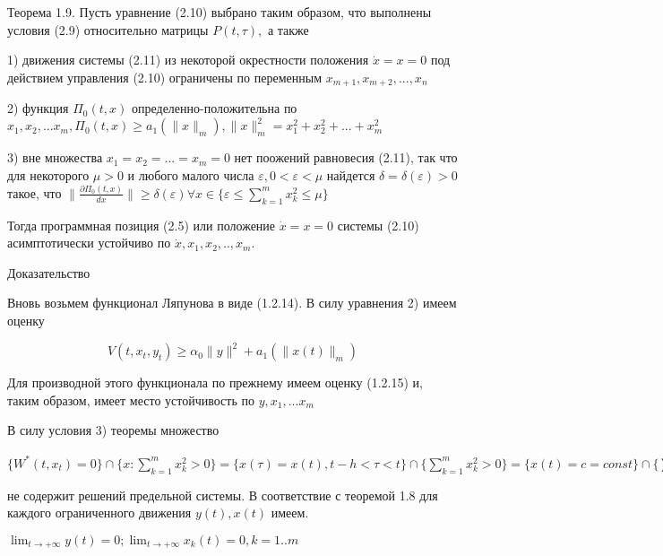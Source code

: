 \begin{theorem}
\begin{theorem}\label{t-1.9}
Теорема 1.9. Пусть уравнение (2.10) выбрано таким образом, что выполнены условия (2.9) относительно матрицы $P(t, \tau),$ а также 

1) движения системы (2.11) из некоторой окрестности положения $\dot x = x= 0$ под действием управления (2.10) ограничены по переменным $x_{m+1}, x_{m+2}, ... , x_n$ 

2) функция $\Pi_0 (t, x)$ определенно-положительна по $x_1, x_2, ... x_m, \Pi_0(t, x) \ge a_1 (\| x \|_m), \| x \|^2_m = x_1^2 + x_2^2 + ... + x_m^2$ 

3) вне множества ${x_1 = x_2 = ... = x_m = 0}$ нет поожений равновесия (2.11), так что для некоторого $\mu > 0$ и любого малого числа  $\varepsilon, 0 < \varepsilon < \mu$ найдется $\delta = \delta(\varepsilon) > 0$ такое, что $\| \frac{\partial \Pi_0 (t, x)}{dx} \| \ge \delta(\varepsilon) \forall x \in \lbrace \varepsilon \le \sum_{k = 1}^{m} x_k^2 \le \mu \rbrace$

Тогда программная позиция (2.5) или положение $\dot x = x = 0$ системы (2.10) асимптотически устойчиво по $\dot x, x_1, x_2,.., x_m.$
\end{theorem}

Доказательство 

Вновь возьмем функционал Ляпунова в виде (1.2.14). В силу уравнения 2) имеем оценку

\begin{equation}
V(t, x_t, y_t) \ge \alpha_0 \| y \| ^2 + a_1 (\| x(t) \|_m)
\end{equation}

Для производной этого функционала по прежнему имеем оценку (1.2.15) и, таким образом, имеет место устойчивость по $y, x_1, ... x_m$

В силу условия 3) теоремы множество 

$ \lbrace W^{*} (t, x_t) = 0 \rbrace \cap \lbrace x : \sum_{k = 1}^{m} x_k^2 > 0 \rbrace = \lbrace x(\tau) = x(t), t - h < \tau < t \rbrace \cap \lbrace \sum_{k = 1}^{m} x_k^2 > 0 \rbrace = \lbrace x(t) = c = const \rbrace \cap \lbrace \sum_{k = 1}^{m} x_k^2 > 0 \rbrace = \lbrace x: \frac{\partial \Pi^{*} (x)}{\partial x} = 0 \rbrace \cap \lbrace \sum_{k = 1}^{m} x_k^2 > 0 \rbrace$

не содержит решений предельной системы. В соответствие с теоремой 1.8 для каждого ограниченного движения $y(t), x(t)$ имеем.

$\lim_{t \to + \infty} y(t) = 0; \lim_{t \to + \infty} x_k (t) = 0, k = 1..m$


\end{theorem}
